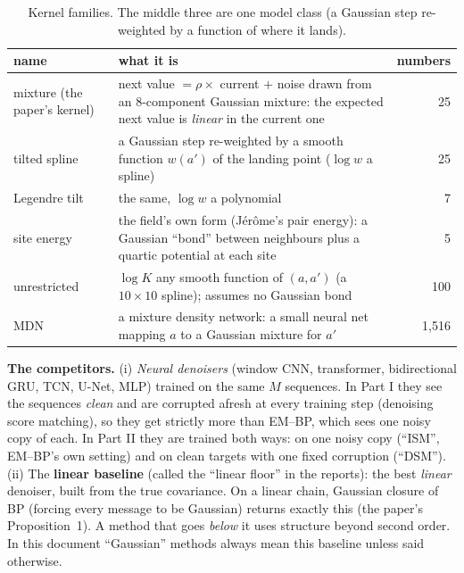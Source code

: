 \documentclass[11pt,a4paper]{article}
\begin{document}
\begin{table}[!htbp]\centering\small
\caption{Kernel families. The middle three are one model class (a Gaussian step re-weighted by a function of where it lands).}
\label{tab:kernels}
\begin{tabularx}{\textwidth}{@{}l L r@{}}
\toprule
name & what it is & numbers \\
\midrule
mixture (the paper's kernel) & next value $=\rho\times$ current $+$ noise drawn from an 8-component Gaussian mixture: the expected next value is \emph{linear} in the current one & 25 \\
tilted spline & a Gaussian step re-weighted by a smooth function $w(a')$ of the landing point ($\log w$ a spline) & 25 \\
Legendre tilt & the same, $\log w$ a polynomial & 7 \\
site energy & the field's own form (Jérôme's pair energy): a Gaussian ``bond'' between neighbours plus a quartic potential at each site & 5 \\
unrestricted & $\log K$ any smooth function of $(a,a')$ (a $10\times10$ spline); assumes no Gaussian bond & 100 \\
MDN & a mixture density network: a small neural net mapping $a$ to a Gaussian mixture for $a'$ & 1{,}516 \\
\bottomrule
\end{tabularx}
\end{table}

\textbf{The competitors.} (i) \emph{Neural denoisers} (window CNN, transformer, bidirectional GRU, TCN, U-Net, MLP) trained on the
same $M$ sequences. In Part I they see the sequences \emph{clean} and are corrupted afresh at every training step (denoising score
matching), so they get strictly more than EM--BP, which sees one noisy copy of each. In Part II they are trained both ways: on one
noisy copy (``ISM'', EM--BP's own setting) and on clean targets with one fixed corruption (``DSM''). (ii) The \textbf{linear baseline} (called the ``linear floor'' in the reports): the best \emph{linear} denoiser,
built from the true covariance. On a linear chain, Gaussian closure of BP (forcing every message to be Gaussian) returns exactly
this (the paper's Proposition~1). A method that goes \emph{below} it uses structure beyond second order. In this document
``Gaussian'' methods always mean this baseline unless said otherwise.
\end{document}
